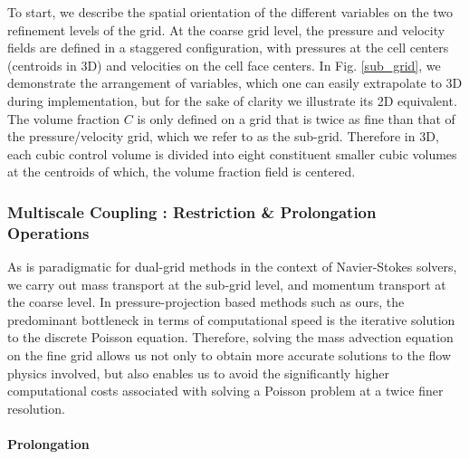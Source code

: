 To start, we describe the spatial orientation of the different 
variables on the two refinement levels of the grid.   
At the coarse grid level, the pressure and velocity fields are 
defined in a staggered configuration, with pressures at the cell 
centers (centroids in 3D) and velocities on the cell face centers. 
In Fig. \ref{sub_grid}, we demonstrate the arrangement of variables, 
which one can easily extrapolate to 3D during implementation, 
but for the sake of clarity we illustrate its 2D equivalent. 
The volume fraction $C$ 
 is only defined on a grid that is twice as fine than 
that of the pressure/velocity grid, which we refer to as the sub-grid. 
Therefore in 3D, each cubic control volume is divided into eight constituent 
smaller cubic volumes at the centroids of which, the volume fraction field is centered. 


\subsubsection*{Multiscale Coupling : Restriction \& Prolongation Operations}

As is paradigmatic for dual-grid methods in the context of 
Navier-Stokes solvers, we carry out mass transport 
at the sub-grid level, and momentum transport at the coarse level. 
In pressure-projection based methods such as ours, the predominant 
bottleneck in terms of computational speed is the 
iterative solution to the discrete Poisson equation. 
Therefore, solving the mass advection equation on the fine grid 
allows us not only to obtain more accurate solutions to the flow physics 
involved, but also enables us to avoid the significantly higher  
computational costs associated with solving a Poisson problem 
at a twice finer resolution.  

\paragraph{\textbf{Prolongation}}

